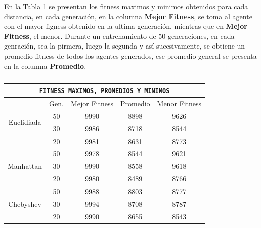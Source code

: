 \documentclass[lettersize, journal]{IEEEtran}
\begin{document}
En la Tabla \ref{tab:fitness_generaciones_maximos_minimos} se presentan los fitness maximos y minimos obtenidos para cada distancia, en cada generación, en la columna \textbf{Mejor Fitness}, se toma al agente con el mayor figness obtenido en la ultima generación, mientras que en \textbf{Mejor Fitness}, el menor. Durante un entrenamiento de 50 generaciones, en cada genración, sea la pirmera, luego la segunda y así sucesivamente, se obtiene un promedio fitness de todos los agentes generados, ese promedio general se presenta en la columna \textbf{Promedio}.
\begin{table}[ht]
\centering
\caption{}
\label{tab:fitness_generaciones_maximos_minimos}
\begin{tabular}{c c c c c}
\multicolumn{5}{c}{\texttt{FITNESS MAXIMOS, PROMEDIOS Y MINIMOS}}\\\toprule
 & \multicolumn{1}{c}{Gen.} &\multicolumn{1}{c}{Mejor Fitness} & \multicolumn{1}{c}{Promedio} & \multicolumn{1}{c}{Menor Fitness} \\ \toprule

\multirow{2}{*}{Euclidiada} & 50 & 9990 & 8898 & 9626\\ 
                            & 30 & 9986 & 8718 & 8544\\
                            & 20 & 9981 & 8631 & 8773\\ \toprule

\multirow{3}{*}{Manhattan}  & 50 & 9978 & 8544 & 9621\\
                            & 30 & 9990 & 8558 & 9618\\ 
                            & 20 & 9980 & 8489 & 8766\\ \toprule

\multirow{3}{*}{Chebyshev}  & 50 & 9988 & 8803 & 8777\\ 
                            & 30 & 9994 & 8708 & 8787\\ 
                            & 20 & 9990 & 8655 & 8543\\ \toprule

\end{tabular}
\end{table}
\end{document}
